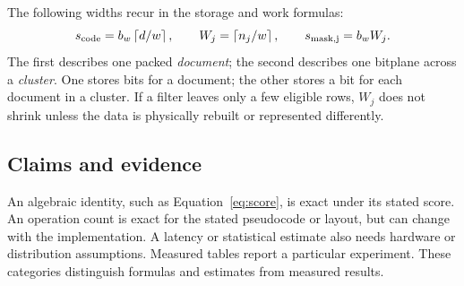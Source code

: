 The following widths recur in the storage and work formulas:
\begin{equation}
s_{\rm code}=b_w\left\lceil d/w\right\rceil,\qquad
W_j=\left\lceil n_j/w\right\rceil,\qquad s_{\rm mask,j}=b_w W_j.
\label{eq:widths}
\end{equation}
The first describes one packed \emph{document}; the second describes one bitplane across a
\emph{cluster}. One stores bits for a document; the other stores a bit for each document in a cluster. If a filter leaves only a few eligible rows,
$W_j$ does not shrink unless the data is physically rebuilt or represented differently.

\subsection{Claims and evidence}
An algebraic identity, such as Equation~\eqref{eq:score}, is exact under its stated score.
An operation count is exact for the stated pseudocode or layout, but can change with the
implementation. A latency or statistical estimate also needs hardware or distribution
assumptions. Measured tables report a particular experiment. These categories distinguish formulas and estimates from
measured results.
